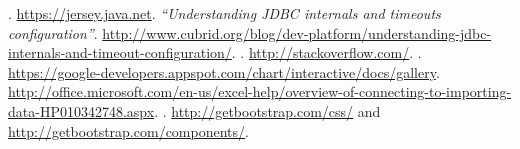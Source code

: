 \documentclass[a4paper,12pt,english]{book}
\begin{document}
\begin{thebibliography}{1}

	. \url{https://jersey.java.net}.
	\bibitem{}{} 
		{\em ``Understanding JDBC internals and timeouts configuration''}.
		\url{http://www.cubrid.org/blog/dev-platform/understanding-jdbc-internals-and-timeout-configuration/}.
	. \url{http://stackoverflow.com/}.
	.
	\url{https://google-developers.appspot.com/chart/interactive/docs/gallery}.
	\url{http://office.microsoft.com/en-us/excel-help/overview-of-connecting-to-importing-data-HP010342748.aspx}.
	. \url{http://getbootstrap.com/css/}
	and \url{http://getbootstrap.com/components/}.
\end{thebibliography}
\end{document}
